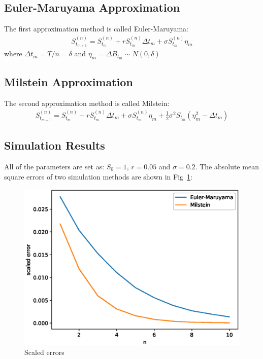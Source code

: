 \documentclass{article} %
\begin{document}
\subsection{Euler-Maruyama Approximation}
The first approximation method is called Euler-Maruyama:
\begin{align}
  S_{t_{m+1}}^{(n)}=S_{t_{m}}^{(n)}+rS_{t_{m}}^{(n)}\Delta t_{m}+\sigma S_{t_{m}}^{(n)}\eta_{m}
\end{align}
where $\Delta t_{m}=T/n=\delta$ and $\eta_{m}=\Delta B_{t_{m}}\sim N(0,\delta)$

\subsection{Milstein Approximation}
The second approximation method is called Milstein:
\begin{align}
  S_{t_{m+1}}^{(n)}=S_{t_{m}}^{(n)}+rS_{t_{m}}^{(n)}\Delta t_{m}+\sigma S_{t_{m}}^{(n)}\eta_{m}+\frac{1}{2}\sigma^{2}S_{t_{m}}(\eta_{m}^{2}-\Delta t_{m})
\end{align}

\subsection{Simulation Results}
All of the parameters are set as: $S_{0}=1$, $r=0.05$ and $\sigma=0.2$. The absolute mean square errors of two simulation methods are shown in Fig~\ref{fig:1}:
\begin{figure}[htbp!]
  \centering
  \includegraphics[width=\textwidth]{mc.eps}
  \caption{Scaled errors}
  \label{fig:1}
\end{figure}
\end{document}
